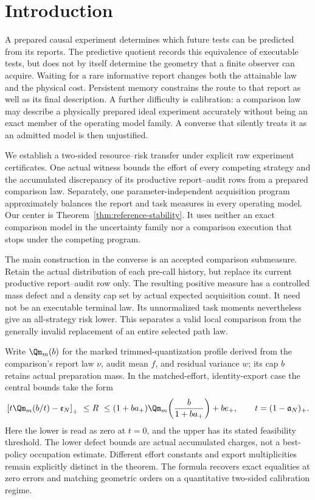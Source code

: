 \section{Introduction}
A prepared causal experiment determines which future tests can be predicted from its reports. The predictive quotient records this equivalence of executable tests, but does not by itself determine the geometry that a finite observer can acquire. Waiting for a rare informative report changes both the attainable law and the physical cost. Persistent memory constrains the route to that report as well as its final description. A further difficulty is calibration: a comparison law may describe a physically prepared ideal experiment accurately without being an exact member of the operating model family. A converse that silently treats it as an admitted model is then unjustified.

We establish a two-sided resource--risk transfer under explicit raw experiment certificates. One actual witness bounds the effort of every competing strategy and the accumulated discrepancy of its productive report--audit rows from a prepared comparison law. Separately, one parameter-independent acquisition program approximately balances the report and task measures in every operating model. Our center is Theorem~\ref{thm:reference-stability}. It uses neither an exact comparison model in the uncertainty family nor a comparison execution that stops under the competing program.

The main construction in the converse is an accepted comparison submeasure. Retain the actual distribution of each pre-call history, but replace its current productive report--audit row only. The resulting positive measure has a controlled mass defect and a density cap set by actual expected acquisition count. It need not be an executable terminal law. Its unnormalized task moments nevertheless give an all-strategy risk lower. This separates a valid local comparison from the generally invalid replacement of an entire selected path law.

Write $\Qm_m(b)$ for the marked trimmed-quantization profile derived from the comparison's report law $\nu$, audit mean $f$, and residual variance $w$; its cap $b$ retains actual preparation mass. In the matched-effort, identity-export case the central bounds take the form
\[
 \left[t\Qm_m(b/t)-\mathfrak e_N\right]_+
 \ \le R\ \le
 (1+ba_+)\Qm_m\!\left(\frac b{1+ba_+}\right)+be_+,
 \qquad t=(1-\mathfrak a_N)_+.
\]
Here the lower is read as zero at $t=0$, and the upper has its stated feasibility threshold. The lower defect bounds are actual accumulated charges, not a best-policy occupation estimate. Different effort constants and export multiplicities remain explicitly distinct in the theorem. The formula recovers exact equalities at zero errors and matching geometric orders on a quantitative two-sided calibration regime.

